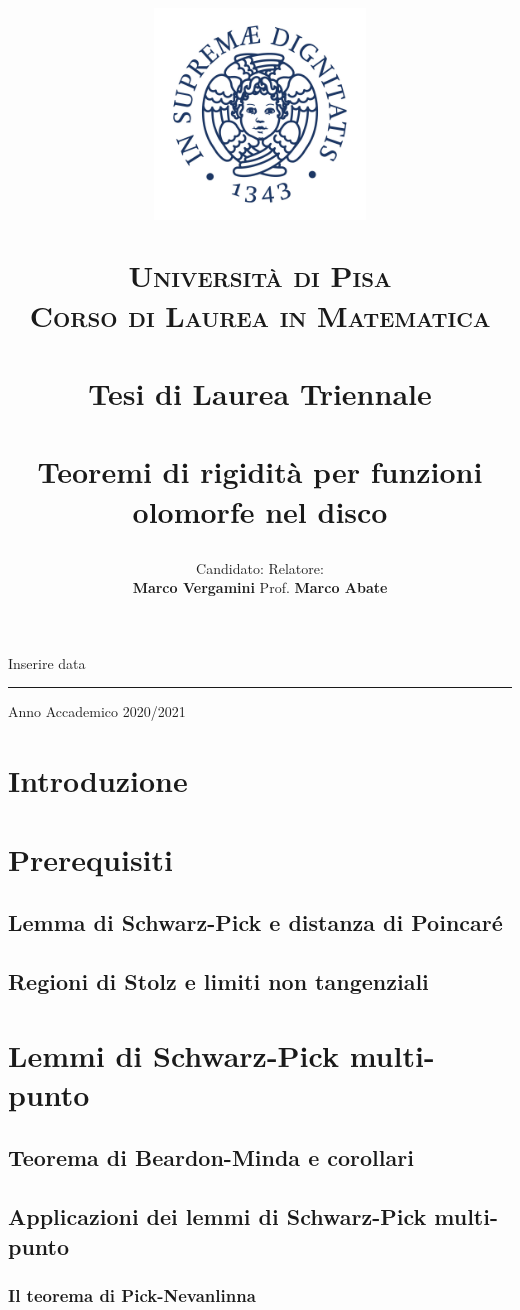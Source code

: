 \documentclass{article}
\title{\begin{figure}[t!]
  \centering
  \includegraphics[trim=0 55 0 60, clip, width=0.5\textwidth]{Stemma_unipi.jpg}
\end{figure}
\vspace{-17.5mm}
\textsc{\Large Università di Pisa}\\
\textsc{\large Corso di Laurea in Matematica}\\
\, \\
{\large Tesi di Laurea Triennale}\\
\, \\
Teoremi di rigidità per funzioni olomorfe nel disco}
\author{Candidato:  \hspace{200px} Relatore:\\
\textbf{Marco Vergamini} \hfill Prof. \textbf{Marco Abate}}
\date{}
\begin{document}
\maketitle
\vspace*{\fill}
\begin{center}
  Inserire data
  \par\noindent\rule{\textwidth}{0.5pt}
  \Large Anno Accademico 2020/2021
\end{center}
\newpage
\tableofcontents
\newpage


\section*{Introduzione}


\newpage

\section{Prerequisiti}

\subsection{Lemma di Schwarz-Pick e distanza di Poincaré}


\subsection{Regioni di Stolz e limiti non tangenziali}


\newpage

\section{Lemmi di Schwarz-Pick multi-punto}

\subsection{Teorema di Beardon-Minda e corollari}


\subsection{Applicazioni dei lemmi di Schwarz-Pick multi-punto}


\subsubsection{Il teorema di Pick-Nevanlinna}

\end{document}
